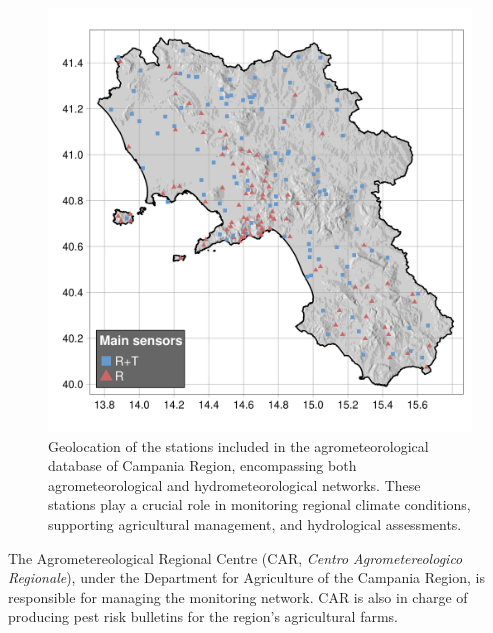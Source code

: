 \documentclass[authoryear,preprint,review,12pt]{elsarticle}
\begin{document}
\begin{figure}
	\centering
    \includegraphics[scale=0.6]{figures/map_stations.png}
	\caption{ Geolocation of the stations included in the agrometeorological database of Campania Region, %
    encompassing both agrometeorological and hydrometeorological networks. These stations play a crucial role in monitoring regional climate conditions, supporting agricultural management, and hydrological assessments.
    }
	\label{fig:rarLocations}
\end{figure}

The Agrometereological Regional Centre (CAR, \emph{Centro Agrometereologico Regionale}), under the Department for Agriculture of the Campania Region, is responsible for managing the monitoring network.
CAR is also in charge of producing pest risk bulletins for the region's agricultural farms.
\end{document}
